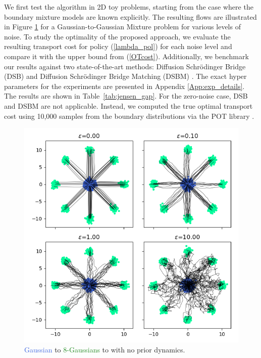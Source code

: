 \documentclass[twoside]{article}
\renewcommand{\eqref}[1]{(\ref{#1})}
\begin{document}
We first test the algorithm in 2D toy problems, starting from the case where the boundary mixture models are known explicitly.
The resulting flows are illustrated in Figure \ref{fig:GMM2D} for a Gaussian-to-Gaussian Mixture problem for various levels of noise.
To study the optimality of the proposed approach, we evaluate the resulting transport cost for policy \eqref{lambda_pol} for each noise level and compare it with the upper bound from \eqref{OTcost}.
Additionally, we benchmark our results against two state-of-the-art methods: Diffusion Schrödinger Bridge (DSB) \citep{de2021diffusion} and Diffusion Schrödinger Bridge Matching (DSBM) \citep{shi2023diffusion}. 
The exact hyper parameters for the experiments are presented in Appendix \ref{App:exp_details}.
The results are shown in Table~\ref{tab:jensen_gap}.
For the zero-noise case, DSB and DSBM are not applicable. Instead, we computed the true optimal transport cost using 10,000 samples from the boundary distributions via the POT library \citep{flamary2021pot}.

\begin{figure}[htb]
    \centering
    \includegraphics[width=1.\linewidth]{figures/2D_GMM.png}
    \caption{\textcolor{RoyalBlue}{Gaussian} to \textcolor{ForestGreen}{8-Gaussians} to with no prior dynamics.}
    \label{fig:GMM2D}
\end{figure}
\end{document}
